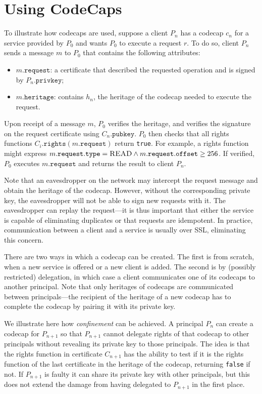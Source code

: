\documentclass[10pt, conference, compsocconf]{IEEEtran}
\begin{document}
\section{Using CodeCaps}

To illustrate how codecaps are used, 
suppose a client $P_n$ has a codecap $c_n$ for a service
provided by $P_0$ and wants $P_0$ to execute a request $r$.
To do so, client $P_n$ sends a message $m$ to $P_0$ that contains the
following attributes:
\begin{itemize}
\item $m.\texttt{request}$: a certificate that described the requested
operation and is signed by $P_n.\texttt{privkey}$;
\item $m.\texttt{heritage}$: contains $h_n$, the heritage of the
codecap needed to execute the request.
\end{itemize}

Upon receipt of a message $m$, $P_0$
verifies the heritage, and verifies the signature on the request
certificate using $C_n.\texttt{pubkey}$.
$P_0$ then checks that all rights functions
$C_i.\texttt{rights}(m.\texttt{request})$ return \texttt{true}.
For example, a rights function might express
$m.\texttt{request}.\texttt{type} = \mbox{\sc READ} \wedge
m.\texttt{request}.\texttt{offset} \ge 256$.
If verified, $P_0$
executes $m.\texttt{request}$
and returns the result to client $P_n$.

Note that an eavesdropper on the network may intercept the request
message and obtain the heritage of the codecap.  However, without the
corresponding private key, the eavesdropper will not be able to
sign new requests with it.
The eavesdropper can replay the request---it is thus important that
either the service is capable
of eliminating duplicates or that requests are idempotent.
In practice, communication between a client and a service is
usually over SSL, eliminating this concern.

There are two ways in which a codecap can be created.
The first is from scratch, when a new service is offered or a new
client is added. The
second is by (possibly restricted) delegation, in which
case a client communicates one of its codecaps to another principal.
Note that only heritages of codecaps are communicated between
principals---the recipient of the heritage of a new codecap has to 
complete the codecap by pairing it with its private key.



We illustrate here how \emph{confinement} can be achieved. 
A principal $P_n$ can create a codecap for $P_{n+1}$ so that
$P_{n+1}$ cannot delegate rights of that codecap to other
principals without revealing its private key to those principals.
The idea is that the rights function in certificate $C_{n+1}$ has the
ability to test if it is the rights function of the last certificate
in the heritage of the codecap, returning \texttt{false} if not.
If $P_{n+1}$ is faulty it can share its private key with other
principals, but this does not extend the damage from having delegated to
$P_{n+1}$ in the first place.
\end{document}
